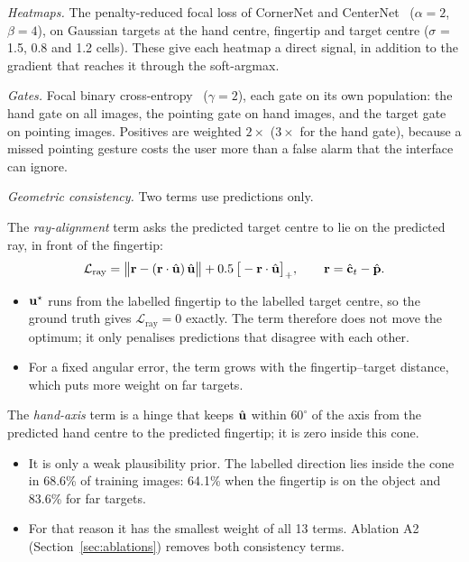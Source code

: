\emph{Heatmaps.} The penalty-reduced focal loss of CornerNet and CenterNet~\cite{law2018cornernet,zhou2019objects} ($\alpha{=}2$, $\beta{=}4$), on Gaussian targets at the hand centre, fingertip and target centre ($\sigma$ = 1.5, 0.8 and 1.2 cells). These give each heatmap a direct signal, in addition to the gradient that reaches it through the soft-argmax.

\emph{Gates.} Focal binary cross-entropy~\cite{lin2017focal} ($\gamma{=}2$), each gate on its own population: the hand gate on all images, the pointing gate on hand images, and the target gate on pointing images. Positives are weighted $2\times$ ($3\times$ for the hand gate), because a missed pointing gesture costs the user more than a false alarm that the interface can ignore.

\emph{Geometric consistency.} Two terms use predictions only.

The \emph{ray-alignment} term asks the predicted target centre to lie on the predicted ray, in front of the fingertip:
\begin{equation}
\mathcal{L}_{\mathrm{ray}} = \big\|\mathbf{r}-(\mathbf{r}\cdot\hat{\mathbf{u}})\,\hat{\mathbf{u}}\big\| + 0.5\,\big[-\mathbf{r}\cdot\hat{\mathbf{u}}\big]_+,\qquad \mathbf{r}=\hat{\mathbf{c}}_t-\hat{\mathbf{p}}.
\end{equation}
\begin{itemize}
\item $\mathbf{u}^\star$ runs from the labelled fingertip to the labelled target centre, so the ground truth gives $\mathcal{L}_{\mathrm{ray}}=0$ exactly. The term therefore does not move the optimum; it only penalises predictions that disagree with each other.
\item For a fixed angular error, the term grows with the fingertip--target distance, which puts more weight on far targets.
\end{itemize}

The \emph{hand-axis} term is a hinge that keeps $\hat{\mathbf{u}}$ within $60^\circ$ of the axis from the predicted hand centre to the predicted fingertip; it is zero inside this cone.
\begin{itemize}
\item It is only a weak plausibility prior. The labelled direction lies inside the cone in 68.6\% of training images: 64.1\% when the fingertip is on the object and 83.6\% for far targets.
\item For that reason it has the smallest weight of all 13 terms. Ablation A2 (Section~\ref{sec:ablations}) removes both consistency terms.
\end{itemize}

